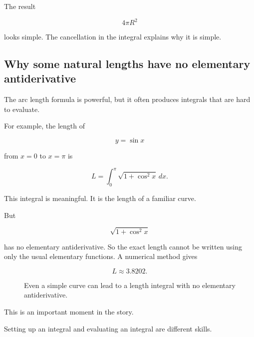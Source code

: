 The result

\[
4\pi R^2
\]

looks simple.  The cancellation in the integral explains why it is simple.

\subsection{Why some natural lengths have no elementary antiderivative}
\label{subsec:natural-lengths-no-elementary-antiderivative}

The arc length formula is powerful, but it often produces integrals that are hard to
evaluate.

For example, the length of

\[
y=\sin x
\]

from \(x=0\) to \(x=\pi\) is

\[
L=\int_0^\pi \sqrt{1+\cos^2 x}\,dx.
\]

This integral is meaningful.  It is the length of a familiar curve.

But

\[
\sqrt{1+\cos^2 x}
\]

has no elementary antiderivative.  So the exact length cannot be written using only the
usual elementary functions.  A numerical method gives

\[
L\approx 3.8202.
\]

\begin{figure}[h]
\centering
{}
\caption{Even a simple curve can lead to a length integral with no elementary antiderivative.}
\label{fig:sine-arc-length}
\end{figure}

This is an important moment in the story.

Setting up an integral and evaluating an integral are different skills.

